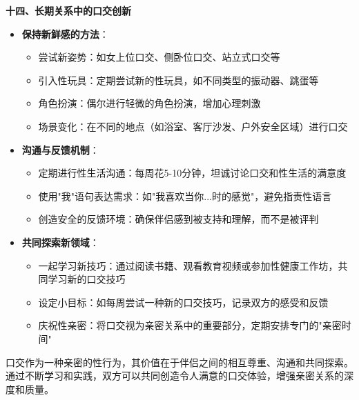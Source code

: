 \documentclass[12pt,UTF8]{ctexbook}
\begin{document}
  \textbf{十四、长期关系中的口交创新}
  \begin{itemize}
  \item \textbf{保持新鲜感的方法}：
    \begin{itemize}
    \item 尝试新姿势：如女上位口交、侧卧位口交、站立式口交等
    \item 引入性玩具：定期尝试新的性玩具，如不同类型的振动器、跳蛋等
    \item 角色扮演：偶尔进行轻微的角色扮演，增加心理刺激
    \item 场景变化：在不同的地点（如浴室、客厅沙发、户外安全区域）进行口交
    \end{itemize}
  \item \textbf{沟通与反馈机制}：
    \begin{itemize}
    \item 定期进行性生活沟通：每周花5-10分钟，坦诚讨论口交和性生活的满意度
    \item 使用"我"语句表达需求：如"我喜欢当你...时的感觉"，避免指责性语言
    \item 创造安全的反馈环境：确保伴侣感到被支持和理解，而不是被评判
    \end{itemize}
  \item \textbf{共同探索新领域}：
    \begin{itemize}
    \item 一起学习新技巧：通过阅读书籍、观看教育视频或参加性健康工作坊，共同学习新的口交技巧
    \item 设定小目标：如每周尝试一种新的口交技巧，记录双方的感受和反馈
    \item 庆祝性亲密：将口交视为亲密关系中的重要部分，定期安排专门的"亲密时间"
    \end{itemize}
  \end{itemize}

口交作为一种亲密的性行为，其价值在于伴侣之间的相互尊重、沟通和共同探索。通过不断学习和实践，双方可以共同创造令人满意的口交体验，增强亲密关系的深度和质量。
\end{document}
